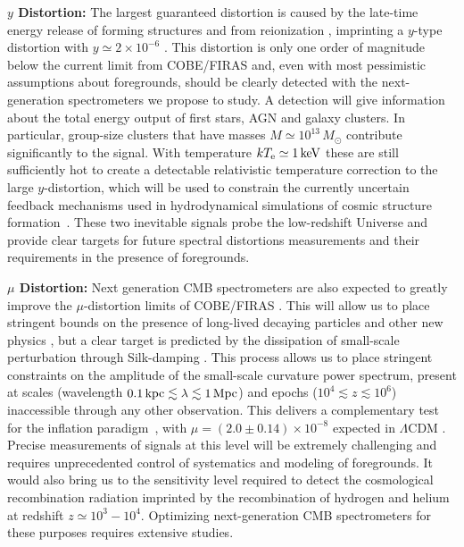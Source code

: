 {\bf $y$ Distortion:} The largest guaranteed distortion is caused by the late-time energy release of forming structures and 
from reionization \citep{Sunyaev1972b, Hu1994pert, Oh2003, Cen1999, Refregier2000}, imprinting a $y$-type distortion 
with $y \simeq 2\times 10^{-6}$ \citep[e.g.,][]{Refregier2000, Hill2015}. This distortion is only one order of magnitude below the current limit 
from COBE/FIRAS and, even with most pessimistic assumptions about foregrounds, should be clearly detected with the next-generation 
spectrometers we propose to study. A detection will give information about the total energy output of first stars, AGN and galaxy clusters. 
In particular, group-size clusters that have masses $M\simeq 10^{13}\,M_{\odot}$ contribute significantly to the signal. 
With temperature $k T_{\rm e}\simeq 1\,{\rm keV}$ these are still sufficiently 
hot to create a detectable relativistic temperature correction to the large $y$-distortion, 
which will be used to constrain the currently uncertain feedback mechanisms used in hydrodynamical simulations
of cosmic structure formation~\citep{Hill2015}. These two inevitable signals probe the low-redshift 
Universe and provide clear targets for future spectral distortions measurements and their requirements in the presence of foregrounds.

{\bf $\mu$ Distortion:} Next generation CMB spectrometers are also expected to greatly improve the $\mu$-distortion 
limits of COBE/FIRAS \citep{Kogut2011PIXIE}. This will allow us to place stringent bounds on the presence of long-lived decaying 
particles \citep{Hu1993b, Chluba2013fore, Chluba2013PCA, Dimastrogiovanni2015} and other new 
physics \citep[e.g.,][]{Jedamzik2000, Tashiro2012, Dolgov2013, Tashiro2013, Caldwell2013, Yacine2015DM}, but a clear target is 
predicted by the dissipation of small-scale perturbation through Silk-damping \citep{Sunyaev1970diss, Daly1991, Hu1994, Chluba2012}. 
This process allows us to place stringent constraints on the amplitude of the small-scale curvature power spectrum, present at 
scales (wavelength $0.1 \,{\rm kpc} \lesssim \lambda \lesssim 1\, {\rm Mpc}$) and epochs ($10^4 \lesssim z\lesssim 10^6$) 
inaccessible through any other observation. This delivers a complementary test for the inflation 
paradigm~\citep{Chluba2012inflaton, Dent2012, Chluba2013PCA, Clesse2014, Cabass2016}, with $\mu=(2.0\pm0.14)\times 10^{-8}$ 
expected in $\Lambda$CDM \citep{Chluba2016LCDM}. Precise measurements of signals at this level will be extremely challenging 
and requires unprecedented control of systematics and modeling of foregrounds. It would also bring us to the sensitivity level required 
to detect the cosmological recombination radiation \citep{Sunyaev2009, Chluba2016} imprinted by the recombination of hydrogen 
and helium at redshift $z\simeq 10^3-10^4$. Optimizing next-generation CMB spectrometers for these purposes requires extensive studies.

